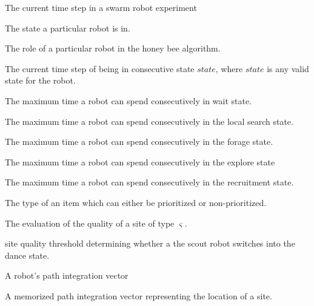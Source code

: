 \begin{description}
\setlength{\itemsep}{-1mm}
	\item[\parbox{\namewidth}{$i$}] The current time step in a swarm robot experiment
	
\item[\parbox{\namewidth}{$state$}] The state a particular robot is in.

\item[\parbox{\namewidth}{$role$}] The role of a particular robot in the honey bee algorithm.

	\item[\parbox{\namewidth}{$i_{state}$}] The current time step of being in consecutive state $state$, where $state$ is any valid state for the robot.
	
	\item[\parbox{\namewidth}{$t_{wait}$}] The maximum time a robot can spend consecutively in wait state.
	
	\item[\parbox{\namewidth}{$t_{ls}$}] The maximum time a robot can spend consecutively in the local search state.
	
	\item[\parbox{\namewidth}{$t_{forage}$}] The maximum time a robot can spend consecutively in the forage state.

	\item[\parbox{\namewidth}{$t_{explore}$}] The maximum time a robot can spend consecutively in the explore state


	\item[\parbox{\namewidth}{$t_{dance}$}] The maximum time a robot can spend consecutively in the recruitment state.
	
	
	\item[\parbox{\namewidth}{$\varsigma$}] The type of an item which can either be prioritized or non-prioritized.

	\item[\parbox{\namewidth}{$\mu_\varsigma$}] The evaluation of the quality of a site of type $\varsigma$.
	
	\item[\parbox{\namewidth}{$\Phi$}] site quality threshold determining whether a the scout robot switches into the dance state. 
	
	\item[\parbox{\namewidth}{$v$}] A robot's path integration vector

	\item[\parbox{\namewidth}{$\omega$}] A memorized path integration vector representing the location of a site.
	

\end{description}

